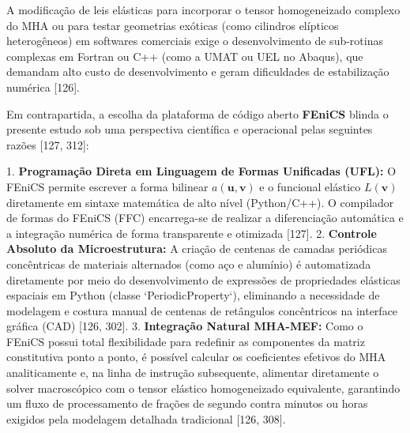 A modificação de leis elásticas para incorporar o tensor homogeneizado complexo do MHA ou para testar geometrias exóticas (como cilindros elípticos heterogêneos) em softwares comerciais exige o desenvolvimento de sub-rotinas complexas em Fortran ou C++ (como a UMAT ou UEL no Abaqus), que demandam alto custo de desenvolvimento e geram dificuldades de estabilização numérica [126].

Em contrapartida, a escolha da plataforma de código aberto \textbf{FEniCS} blinda o presente estudo sob uma perspectiva científica e operacional pelas seguintes razões [127, 312]:

1. \textbf{Programação Direta em Linguagem de Formas Unificadas (UFL):} O FEniCS permite escrever a forma bilinear $a(\mathbf{u}, \mathbf{v})$ e o funcional elástico $L(\mathbf{v})$ diretamente em sintaxe matemática de alto nível (Python/C++). O compilador de formas do FEniCS (FFC) encarrega-se de realizar a diferenciação automática e a integração numérica de forma transparente e otimizada [127].
2. \textbf{Controle Absoluto da Microestrutura:} A criação de centenas de camadas periódicas concêntricas de materiais alternados (como aço e alumínio) é automatizada diretamente por meio do desenvolvimento de expressões de propriedades elásticas espaciais em Python (classe `PeriodicProperty`), eliminando a necessidade de modelagem e costura manual de centenas de retângulos concêntricos na interface gráfica (CAD) [126, 302].
3. \textbf{Integração Natural MHA-MEF:} Como o FEniCS possui total flexibilidade para redefinir as componentes da matriz constitutiva ponto a ponto, é possível calcular os coeficientes efetivos do MHA analiticamente e, na linha de instrução subsequente, alimentar diretamente o solver macroscópico com o tensor elástico homogeneizado equivalente, garantindo um fluxo de processamento de frações de segundo contra minutos ou horas exigidos pela modelagem detalhada tradicional [126, 308].
